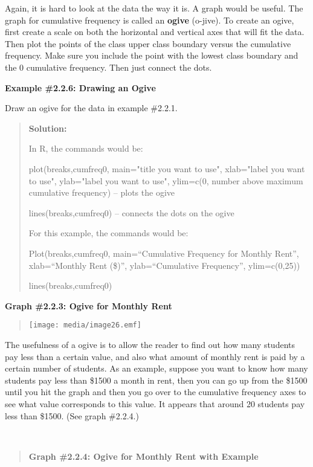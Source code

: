 \documentclass[]{book}
\begin{document}
Again, it is hard to look at the data the way it is. A graph would be
useful. The graph for cumulative frequency is called an \textbf{ogive}
(o-jive). To create an ogive, first create a scale on both the
horizontal and vertical axes that will fit the data. Then plot the
points of the class upper class boundary versus the cumulative
frequency. Make sure you include the point with the lowest class
boundary and the 0 cumulative frequency. Then just connect the dots.

\textbf{Example \#2.2.6: Drawing an Ogive}

Draw an ogive for the data in example \#2.2.1.

\begin{quote}
\textbf{Solution:}

In R, the commands would be:

plot(breaks,cumfreq0, main="title you want to use", xlab="label you
want to use", ylab="label you want to use", ylim=c(0, number above
maximum cumulative frequency) -- plots the ogive

lines(breaks,cumfreq0) -- connects the dots on the ogive

For this example, the commands would be:

Plot(breaks,cumfreq0, main=``Cumulative Frequency for Monthly Rent'',
xlab=``Monthly Rent (\$)'', ylab=``Cumulative Frequency'', ylim=c(0,25))

lines(breaks,cumfreq0)
\end{quote}

\textbf{Graph \#2.2.3: Ogive for Monthly Rent}

\begin{quote}
\texttt{[image: media/image26.emf]}
\end{quote}

The usefulness of a ogive is to allow the reader to find out how many
students pay less than a certain value, and also what amount of monthly
rent is paid by a certain number of students. As an example, suppose you
want to know how many students pay less than \$1500 a month in rent,
then you can go up from the \$1500 until you hit the graph and then you
go over to the cumulative frequency axes to see what value corresponds
to this value. It appears that around 20 students pay less than \$1500.
(See graph \#2.2.4.)

\textbf{\\
}

\begin{quote}
\textbf{Graph \#2.2.4: Ogive for Monthly Rent with Example}
\end{quote}
\end{document}
